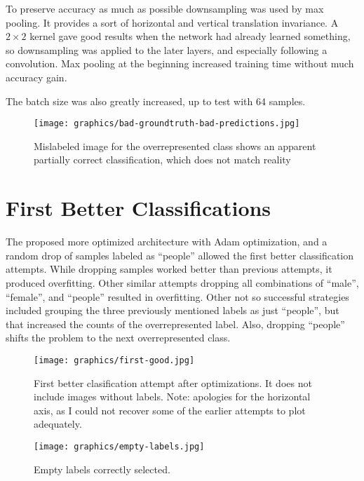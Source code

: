 \documentclass{article}
\begin{document}
To preserve accuracy as much as possible downsampling was used by max pooling. 
It provides a sort of horizontal and vertical translation invariance.
A \(2 \times 2\) kernel gave good results when the network had already learned something, so downsampling was applied to the later layers, and especially following a convolution.
Max pooling at the beginning increased training time without much accuracy gain.

The batch size was also greatly increased, up to test with 64 samples.

\begin{figure}[ht]
  \centering
  \texttt{[image: graphics/bad-groundtruth-bad-predictions.jpg]}
  \caption{Mislabeled image for the overrepresented class shows an apparent partially correct classification, which does not match reality}
\end{figure}

\section{First Better Classifications}
The proposed more optimized architecture with Adam optimization, and a random drop of samples labeled as ``people'' allowed the first better classification attempts.
While dropping samples worked better than previous attempts, it produced overfitting.
Other similar attempts dropping all combinations of ``male'', ``female'', and ``people'' resulted in overfitting.
Other not so successful strategies included grouping the three previously mentioned labels as just ``people'', but that increased the counts of the overrepresented label.
Also, dropping ``people'' shifts the problem to the next overrepresented class.


\begin{figure}[ht]
  \centering
  \texttt{[image: graphics/first-good.jpg]}
  \caption{First better clasification attempt after optimizations.
      It does not include images without labels.
    Note: apologies for the horizontal axis, as I could not recover some of the earlier attempts to plot adequately.}
\end{figure}

\begin{figure}[ht]
  \centering
  \texttt{[image: graphics/empty-labels.jpg]}
  \caption{Empty labels correctly selected.}
\end{figure}
\end{document}
